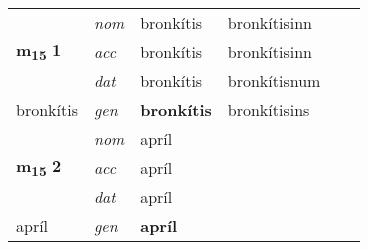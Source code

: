 \begin{longtable}[l]{X>{\footnotesize\itshape}XXXXX}
\multirow{3}{*}{{{\textbf{m{\textsubscript{15}}} \Large{\textbf{1}}}}} & nom & bronkítis & bronkítisinn & \textbf{} &  \\*
 & acc & bronkítis & bronkítisinn &  &  \\*
 & dat & bronkítis & bronkítisnum &  &  \\*
 {\footnotesize{bronkítis}} & gen & \textbf{bronkítis} & bronkítisins &  &  \\
\cmidrule{1-6}

\multirow{3}{*}{{{\textbf{m{\textsubscript{15}}} \Large{\textbf{2}}}}} & nom & apríl &  & \textbf{} &  \\*
 & acc & apríl &  &  &  \\*
 & dat & apríl &  &  &  \\*
 {\footnotesize{apríl}} & gen & \textbf{apríl} &  &  &  \\
\end{longtable}
